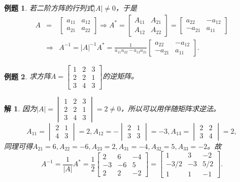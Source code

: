 \documentclass[a4paper]{book}
\newtheorem{eg}{例题}[chapter]
\newtheorem*{solution}{解}
\begin{document}
\begin{eg}
若二阶方阵的行列式$|A| \neq 0$，于是
\begin{eqnarray*}
A & = & \begin{bmatrix} a_{11} & a_{12} \\ a_{21} & a_{22} \end{bmatrix} \Rightarrow A^{\ast} = \begin{bmatrix} A_{11} & A_{21} \\ A_{12} & A_{22} \end{bmatrix} = \begin{bmatrix} a_{22} & -a_{12} \\ -a_{21} & a_{11} \end{bmatrix} \\
& \Rightarrow & A^{-1} = |A|^{-1}A^{\ast} = \frac{1}{a_{11}a_{22} - a_{12}a_{21}} \begin{bmatrix} a_{22} & -a_{12} \\ -a_{21} & a_{11} \end{bmatrix}.
\end{eqnarray*}
\end{eg}

\begin{eg}
求方阵$A = \begin{bmatrix} 1 & 2 & 3 \\ 2 & 2 & 1 \\ 3 & 4 & 3 \end{bmatrix}$的逆矩阵。
\end{eg}

\begin{solution}
因为$|A| = \begin{vmatrix} 1 & 2 & 3 \\ 2 & 2 & 1 \\ 3 & 4 & 3 \end{vmatrix} = 2 \neq 0$，所以可以用伴随矩阵求逆法。
$$A_{11} = \begin{vmatrix} 2 & 1 \\ 4 & 3 \end{vmatrix} = 2, A_{12} = -\begin{vmatrix} 2 & 1 \\ 3 & 3 \end{vmatrix} = -3, A_{13} = \begin{vmatrix} 2 & 2 \\ 3 & 4 \end{vmatrix} = 2,$$
同理可得$A_{21} = 6, A_{22} = -6, A_{23} = 2, A_{31} = -4, A_{32} = 5, A_{33} = -2$。故
$$A^{-1} = \frac{1}{|A|}A^{\ast} = \frac12 \begin{bmatrix} 2 & 6 & -4 \\ -3 & -6 & 5 \\ 2 & 2 & -2 \end{bmatrix} = \begin{bmatrix} 1 & 3 & -2 \\ -3/2 & -3 & 5/2 \\ 1 & 1 & -1 \end{bmatrix}.$$
\end{solution}
\end{document}
